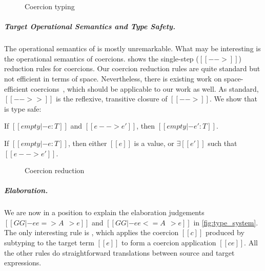 \begin{figure}[t]
  \centering
  \begin{small}
  \end{small}
  \caption{Coercion typing}
  \label{fig:co}
\end{figure}

\subparagraph{Target Operational Semantics and Type Safety.}

The operational semantics of \tname is mostly unremarkable. What may be
interesting is the operational semantics of coercions. 
shows the single-step ($[[-->]]$) reduction rules for coercions. Our coercion
reduction rules are quite standard but not efficient in terms of space.
Nevertheless, there is existing work on space-efficient
coercions~\cite{Siek_2015, herman2010space}, which should be applicable
to our work as well.
As standard, $[[-->>]]$ is the reflexive, transitive closure of $[[-->]]$.
We show that \tname is type safe:
\begin{theorem}[Preservation]
  If $[[empty |- e : T]]$ and $[[e --> e']]$, then $[[empty |- e' : T]]$.
\end{theorem}
\begin{theorem}[Progress]
  If $[[empty |- e : T]]$, then either $[[e]]$ is a value, or $\exists [[e']]$ such
  that $[[e --> e']]$.
\end{theorem}


\begin{figure}[t]
  \centering
  \begin{small}
  \end{small}
  \caption{Coercion reduction}
  \label{fig:coercion_red}
\end{figure}



\subparagraph{Elaboration.}
\begin{comment}
The subtyping judgement in \cref{fig:subtype_decl} has the form $[[A <: B ~~>
c]]$, which says that the subtyping
derivation of $[[A <: B]]$ produces a coercion $[[c]]$ that is used to convert a
term of type $[[ |A| ]]$ to type $[[ |B| ]]$. Each
subtyping rule has its own specific form of coercion.
\end{comment}
We are now in a position to explain the elaboration judgements $[[GG |- ee
=> A ~~> e]]$ and $[[GG |- ee <= A ~~> e]]$ in \cref{fig:type_system}. The only
interesting rule is , which applies the coercion $[[c]]$ produced by
subtyping to the target term $[[e]]$ to form a coercion application
$[[c e]]$. All the other rules do straightforward translations between
source and target expressions.


